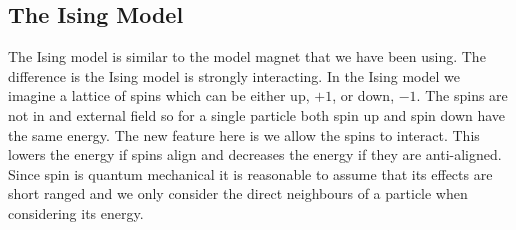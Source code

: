\documentclass[a4paper]{article}
\begin{document}
    \subsection{The Ising Model}
    The Ising model is similar to the model magnet that we have been using.
    The difference is the Ising model is strongly interacting.
    In the Ising model we imagine a lattice of spins which can be either up, \(+1\), or down, \(-1\).
    The spins are not in and external field so for a single particle both spin up and spin down have the same energy.
    The new feature here is we allow the spins to interact.
    This lowers the energy if spins align and decreases the energy if they are anti-aligned.
    Since spin is quantum mechanical it is reasonable to assume that its effects are short ranged and we only consider the direct neighbours of a particle when considering its energy.
    
\end{document}
